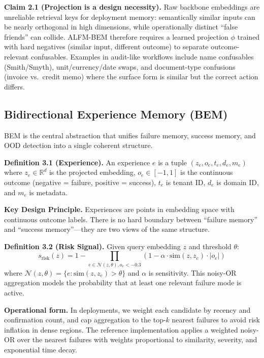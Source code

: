 \documentclass[twoside,11pt]{article}
\newcommand{\R}{\mathbb{R}}
\begin{document}
\textbf{Claim 2.1 (Projection is a design necessity).} Raw backbone embeddings are unreliable retrieval keys for deployment memory: semantically similar inputs can be nearly orthogonal in high dimensions, while operationally distinct ``false friends'' can collide. ALFM-BEM therefore requires a learned projection $\phi$ trained with hard negatives (similar input, different outcome) to separate outcome-relevant confusables. Examples in audit-like workflows include name confusables (Smith/Smyth), unit/currency/date swaps, and document-type confusions (invoice vs.\ credit memo) where the surface form is similar but the correct action differs.

\subsection{Bidirectional Experience Memory (BEM)}
\label{sec:bem}

BEM is the central abstraction that unifies failure memory, success memory, and OOD detection into a single coherent structure.

\textbf{Definition 3.1 (Experience).} An experience $e$ is a tuple $(z_e, o_e, t_e, d_e, m_e)$ where $z_e \in \R^d$ is the projected embedding, $o_e \in [-1, 1]$ is the continuous outcome (negative = failure, positive = success), $t_e$ is tenant ID, $d_e$ is domain ID, and $m_e$ is metadata.

\textbf{Key Design Principle.} Experiences are points in embedding space with continuous outcome labels. There is no hard boundary between ``failure memory'' and ``success memory''---they are two views of the same structure.

\textbf{Definition 3.2 (Risk Signal).} Given query embedding $z$ and threshold $\theta$:
\begin{equation}
    s_{\text{risk}}(z) = 1 - \prod_{e \in \mathcal{N}(z,\theta), o_e < -0.3} \left(1 - \alpha \cdot \text{sim}(z, z_e) \cdot |o_e|\right)
\end{equation}
where $\mathcal{N}(z, \theta) = \{e : \text{sim}(z, z_e) > \theta\}$ and $\alpha$ is sensitivity. This noisy-OR aggregation models the probability that at least one relevant failure mode is active.

\textbf{Operational form.} In deployments, we weight each candidate by recency and confirmation count, and cap aggregation to the top-$k$ nearest failures to avoid risk inflation in dense regions. The reference implementation applies a weighted noisy-OR over the nearest failures with weights proportional to similarity, severity, and exponential time decay.
\end{document}
